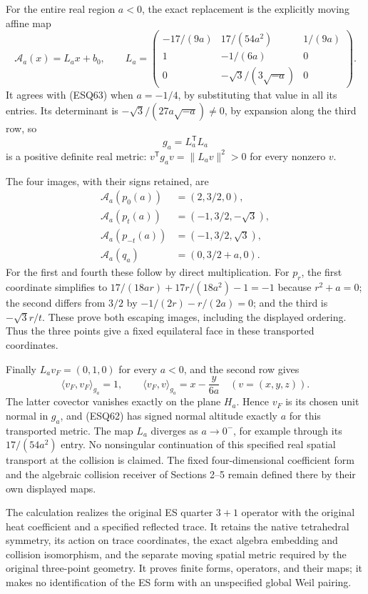 \documentclass[
  10pt,
  a4paper,
]{article}
\begin{document}
For the entire real region \(a<0\), the exact replacement is the
explicitly moving affine map \[
\mathscr A_a(x)=L_ax+b_0,\qquad
L_a=\begin{pmatrix}
-17/(9a)&17/(54a^2)&1/(9a)\\
1&-1/(6a)&0\\
0&-\sqrt3/(3\sqrt{-a})&0
\end{pmatrix}.
\tag{ESQ65}
\] It agrees with (ESQ63) when \(a=-1/4\), by substituting that value in
all its entries. Its determinant is \(-\sqrt3/(27a\sqrt{-a})\ne0\), by
expansion along the third row, so \[
g_a=L_a^{\mathsf T}L_a
\tag{ESQ66}
\] is a positive definite real metric:
\(v^{\mathsf T}g_av=\|L_av\|^2>0\) for every nonzero \(v\).

The four images, with their signs retained, are \[
\begin{aligned}
\mathscr A_a(p_0(a))&=(2,3/2,0),\\
\mathscr A_a(p_t(a))&=(-1,3/2,-\sqrt3),\\
\mathscr A_a(p_{-t}(a))&=(-1,3/2,\sqrt3),\\
\mathscr A_a(q_a)&=(0,3/2+a,0).
\end{aligned}
\tag{ESQ67}
\] For the first and fourth these follow by direct multiplication. For
\(p_r\), the first coordinate simplifies to
\(17/(18ar)+17r/(18a^2)-1=-1\) because \(r^2+a=0\); the second differs
from \(3/2\) by \(-1/(2r)-r/(2a)=0\); and the third is \(-\sqrt3r/t\).
These prove both escaping images, including the displayed ordering. Thus
the three points give a fixed equilateral face in these transported
coordinates.

Finally \(L_av_F=(0,1,0)\) for every \(a<0\), and the second row gives
\[
\langle v_F,v_F\rangle_{g_a}=1,\qquad
\langle v_F,v\rangle_{g_a}=x-\frac{y}{6a}
\quad(v=(x,y,z)).
\tag{ESQ68}
\] The latter covector vanishes exactly on the plane \(H_a\). Hence
\(v_F\) is its chosen unit normal in \(g_a\), and (ESQ62) has signed
normal altitude exactly \(a\) for this transported metric. The map
\(L_a\) diverges as \(a\to0^-\), for example through its \(17/(54a^2)\)
entry. No nonsingular continuation of this specified real spatial
transport at the collision is claimed. The fixed four-dimensional
coefficient form and the algebraic collision receiver of Sections 2--5
remain defined there by their own displayed maps.

The calculation realizes the original ES quarter \(3+1\) operator with
the original heat coefficient and a specified reflected trace. It
retains the native tetrahedral symmetry, its action on trace
coordinates, the exact algebra embedding and collision isomorphism, and
the separate moving spatial metric required by the original three-point
geometry. It proves finite forms, operators, and their maps; it makes no
identification of the ES form with an unspecified global Weil pairing.
\end{document}
